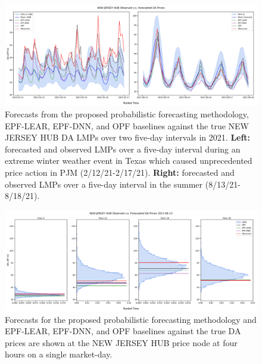 \begin{figure}[htbp]
    \caption[Timeseries of observed v.s. forecast prices over 2/12/21-2/17/21 and 8/13/21-8/18/21]{
        Forecasts from the proposed probabilistic forecasting methodology, EPF-LEAR, EPF-DNN, and OPF baselines
        against the true NEW JERSEY HUB DA LMPs over two five-day intervals in 2021.
        \textbf{Left:} forecasted and observed LMPs over a five-day interval during an extreme winter weather event in Texas which
        caused unprecedented price action in PJM (2/12/21-2/17/21).
        \textbf{Right:} forecasted and observed LMPs over a five-day interval in the summer (8/13/21-8/18/21).
    }
    \begin{center}
        \setlength{\fboxsep}{0pt}%
        \setlength{\fboxrule}{1pt}%
        \includegraphics[width=150mm]{figs/nj_hub_ts}
    \end{center}
    \label{fig:forecast_timeseries}
\end{figure}

\begin{figure}[htbp]
    \caption[Density forecasts v.s. point forecasts v.s. observed prices on 8/13/21 hours 4, 12, 16, and 20]{
        Forecasts for the proposed probabilistic forecasting methodology and EPF-LEAR, EPF-DNN, and OPF baselines
        against the true DA prices are shown at the NEW JERSEY HUB price node at four hours on a single market-day.
    }
    \begin{center}
        \setlength{\fboxsep}{0pt}%
        \setlength{\fboxrule}{1pt}%
        \includegraphics[width=150mm]{figs/nj_hub_densities}
    \end{center}
    \label{fig:univar_dens}
\end{figure}
